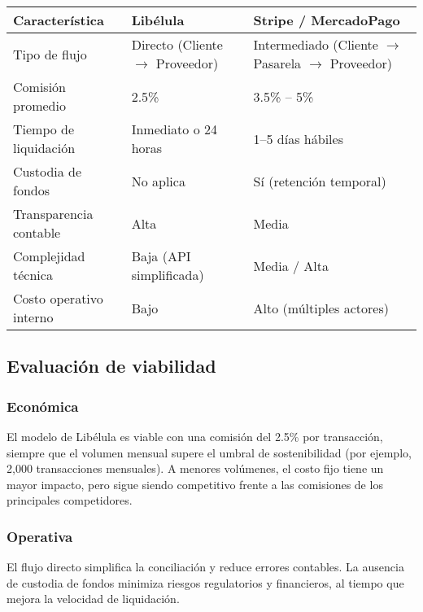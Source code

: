       \begin{center}
          \begin{tabular}{>{\raggedright}p{4cm} p{5cm} p{5cm}}
              \toprule
              \textbf{Característica} & \textbf{Libélula} & \textbf{Stripe / MercadoPago} \\
              \midrule
              Tipo de flujo & Directo (Cliente $\rightarrow$ Proveedor) & Intermediado (Cliente $\rightarrow$ Pasarela $\rightarrow$ Proveedor) \\
              Comisión promedio & 2.5\% & 3.5\% -- 5\% \\
              Tiempo de liquidación & Inmediato o 24 horas & 1--5 días hábiles \\
              Custodia de fondos & No aplica & Sí (retención temporal) \\
              Transparencia contable & Alta & Media \\
              Complejidad técnica & Baja (API simplificada) & Media / Alta \\
              Costo operativo interno & Bajo & Alto (múltiples actores) \\
              \bottomrule
          \end{tabular}
      \end{center}
      
  \subsection{Evaluación de viabilidad}

      \subsubsection{Económica}
      El modelo de Libélula es viable con una comisión del 2.5\% por transacción, siempre que el volumen mensual supere el 
      umbral de sostenibilidad (por ejemplo, 2,000 transacciones mensuales). A menores volúmenes, el costo fijo tiene un mayor 
      impacto, pero sigue siendo competitivo frente a las comisiones de los principales competidores.\par
      
      \subsubsection{Operativa}
        El flujo directo simplifica la conciliación y reduce errores contables. La ausencia de custodia de fondos minimiza 
      riesgos regulatorios y financieros, al tiempo que mejora la velocidad de liquidación.\par
      

